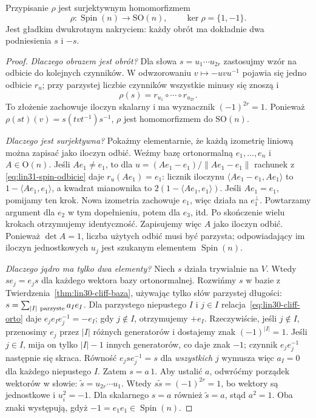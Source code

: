\begin{twierdzenie}
\label{thm:lin31-spin-nakrycie}
Przypisanie $\rho$ jest surjektywnym homomorfizmem
\[
 \rho:\operatorname{Spin}(n)\longrightarrow\mathrm{SO}(n),
 \qquad\ker\rho=\{1,-1\}.
\]
Jest gładkim dwukrotnym nakryciem: każdy obrót
ma dokładnie dwa podniesienia $s$ i $-s$.
\end{twierdzenie}
\begin{proof}
\emph{Dlaczego obrazem jest obrót?}
Dla słowa $s=u_1\cdots u_{2r}$ zastosujmy
wzór na odbicie do kolejnych czynników.
W odwzorowaniu $v\mapsto-u v u^{-1}$ pojawia się
jedno odbicie $r_u$; przy parzystej liczbie
czynników wszystkie minusy się znoszą i
\[
 \rho(s)=r_{u_1}\circ\cdots\circ r_{u_{2r}}.
\]
To złożenie zachowuje iloczyn skalarny i ma
wyznacznik $(-1)^{2r}=1$. Ponieważ
$\rho(st)(v)=s(tvt^{-1})s^{-1}$,
$\rho$ jest homomorfizmem do $\mathrm{SO}(n)$.

\emph{Dlaczego jest surjektywna?}
Pokażmy elementarnie, że każdą izometrię liniową
można zapisać jako iloczyn odbić. Weźmy bazę
ortonormalną $e_1,\ldots,e_n$ i $A\in\mathrm O(n)$.
Jeśli $Ae_1\ne e_1$, to dla
$u=(Ae_1-e_1)/\|Ae_1-e_1\|$ rachunek z
\eqref{eq:lin31-spin-odbicie} daje $r_u(Ae_1)=e_1$:
licznik iloczynu
$\langle Ae_1-e_1,Ae_1\rangle$ to
$1-\langle Ae_1,e_1\rangle$, a kwadrat
mianownika to $2(1-\langle Ae_1,e_1\rangle)$.
Jeśli $Ae_1=e_1$, pomijamy ten krok.
Nowa izometria zachowuje $e_1$, więc działa
na $e_1^\perp$. Powtarzamy argument dla $e_2$
w tym dopełnieniu, potem dla $e_3$, itd.
Po skończenie wielu krokach otrzymujemy
identyczność. Zapisujemy więc $A$ jako
iloczyn odbić. Ponieważ $\det A=1$, liczba
użytych odbić musi być parzysta; odpowiadający
im iloczyn jednostkowych $u_j$ jest szukanym
elementem $\operatorname{Spin}(n)$.

\emph{Dlaczego jądro ma tylko dwa elementy?}
Niech $s$ działa trywialnie na $V$. Wtedy
$se_j=e_js$ dla każdego wektora bazy ortonormalnej.
Rozwińmy $s$ w bazie z
Twierdzenia~\ref{thm:lin30-cliff-baza}, używając tylko
słów parzystej długości:
$s=\sum_{|I|\ {\rm parzyste}}a_I e_I$.
Dla parzystego niepustego $I$ i $j\in I$
relacja~\eqref{eq:lin30-cliff-orto} daje
$e_je_Ie_j^{-1}=-e_I$; gdy $j\notin I$,
otrzymujemy $+e_I$.
Rzeczywiście, jeśli $j\notin I$, przenosimy $e_j$
przez $|I|$ różnych generatorów i dostajemy znak
$(-1)^{|I|}=1$. Jeśli $j\in I$, mija on tylko
$|I|-1$ innych generatorów, co daje znak $-1$;
czynnik $e_je_j^{-1}$ następnie się skraca. Równość
$e_jse_j^{-1}=s$ dla \emph{wszystkich} $j$
wymusza więc $a_I=0$ dla każdego niepustego $I$.
Zatem $s=a\,1$. Aby ustalić $a$, odwróćmy
porządek wektorów w słowie:
$\widetilde s=u_{2r}\cdots u_1$.
Wtedy $s\widetilde s=(-1)^{2r}=1$,
bo wektory są jednostkowe i $u_i^2=-1$.
Dla skalarnego $s=a$ również $\widetilde s=a$,
stąd $a^2=1$. Oba znaki występują,
gdyż $-1=e_1e_1\in\operatorname{Spin}(n)$.


\end{proof}
